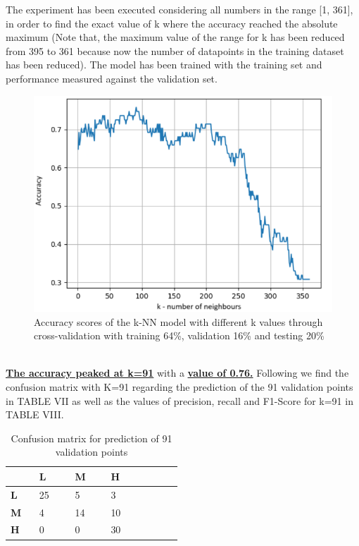 \documentclass[11pt,a4paper]{article}
\begin{document}
The experiment has been executed considering all numbers in the range [1, 361], in order to find the exact value of k where the accuracy reached the absolute maximum (Note that, the maximum value of the range for k has been reduced from 395 to 361 because now the number of datapoints in the training dataset has been reduced). The model has been trained with the training set and performance measured against the validation set. 
\begin{figure}
    \centering
    \includegraphics[width=1\linewidth]{ICS-5110-Fig-11.png}
    \caption{Accuracy scores of the k-NN model with different k values through cross-validation with training 64\%,  validation 16\% and testing 20\%}
    \label{fig:Accuracy scores of the k-NN model with different k values in training 64/16/20}
\end{figure}
\\
\uline{\textbf{The accuracy peaked at k=91}} with a \uline{\textbf{value of 0.76.}}
Following we find the confusion matrix with K=91 regarding the prediction of the 91 validation points in TABLE VII as well as the values of precision, recall and F1-Score for k=91 in TABLE VIII.
\begin{table}
\centering
\begin{tabular}{p{0.12\linewidth}|p{0.15\linewidth}|p{0.15\linewidth}|p{0.15\linewidth}|p{0.15\linewidth}} \hline
&\textbf{L}&\textbf{M}&\textbf{H}\\ \hline
\textbf{L}&25&5&3\\ \hline
\textbf{M}&4&14&10\\ \hline
\textbf{H}&0&0&30\\ \hline
\end{tabular}
\caption{Confusion matrix for prediction of 91 validation points}
\label{tab:Confusion matrix for prediction of 91 validation points}
\end{table}
\end{document}
